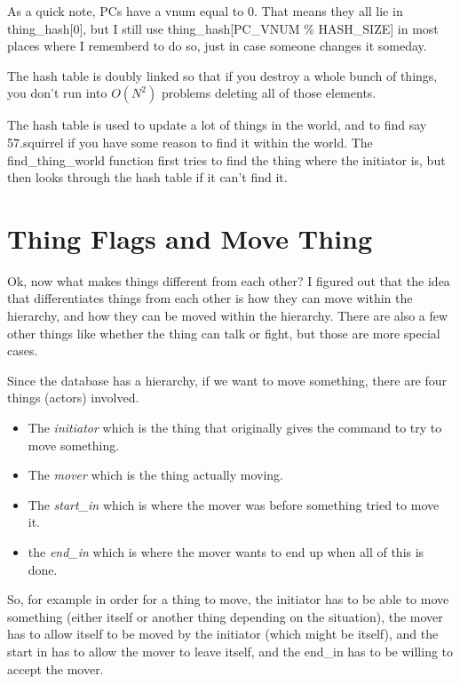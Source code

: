 As a quick note, PCs have a vnum equal to 0. That means they all lie
in thing\_hash[0], but I still use thing\_hash[PC\_VNUM \% HASH\_SIZE] in
most places where I rememberd to do so, just in case someone changes
it someday.

The hash table is doubly linked so that if you destroy a whole bunch
of things, you don't run into $O(N^2)$ problems deleting all of those
elements.

The hash table is used to update a lot of things in the world, and to find
say 57.squirrel if you have some reason to find it within the world. 
The find\_thing\_world function first tries to find the thing where the
initiator is, but then looks through the hash table if it can't find it.



\section{Thing Flags and Move Thing}

Ok, now what makes things different from each other? I figured out
that the idea that differentiates things from each other is how they
can move within the hierarchy, and how they can be moved within the
hierarchy. There are also a few other things like whether the thing
 can talk or fight, but those are more special cases. 

Since the database has a hierarchy, if we want to move something,
there are four things (actors) involved.

\begin{itemize}

\item The {\it{initiator}} which is the thing that originally gives the command to try to move something.

\item The {\it{mover}} which is the thing actually moving.

\item The {\it{start\_in}} which is where the mover was before something tried to move it.

\item the {\it{end\_in}} which is where the mover wants to end up when all of this is done.


\end{itemize}

So, for example in order for a thing to move, the initiator has to be able to move something (either itself or another thing depending on the situation), the mover has to allow itself to be moved by the initiator (which might be itself), and the start in has to allow the mover to leave itself, and the end\_in has to be willing to accept the mover.

